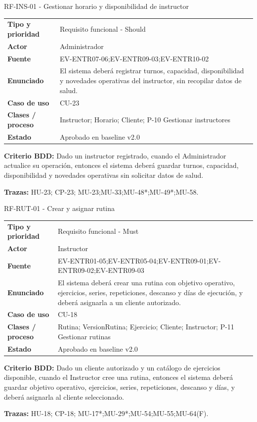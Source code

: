 \begin{reqbox}{RF-INS-01 - Gestionar horario y disponibilidad de instructor}
\begin{tabularx}{\textwidth}{>{\bfseries}p{3.2cm}Y}
Tipo y prioridad & Requisito funcional - Should \\
Actor & Administrador \\
Fuente & EV-ENTR07-06;EV-ENTR09-03;EV-ENTR10-02 \\
Enunciado & El sistema deberá registrar turnos, capacidad, disponibilidad y novedades operativas del instructor, sin recopilar datos de salud. \\
Caso de uso & CU-23 \\
Clases / proceso & Instructor; Horario; Cliente; P-10 Gestionar instructores \\
Estado & Aprobado en baseline v2.0 \\
\end{tabularx}
\textbf{Criterio BDD:} Dado un instructor registrado, cuando el Administrador actualice su operación, entonces el sistema deberá guardar turnos, capacidad, disponibilidad y novedades operativas sin solicitar datos de salud.

\textbf{Trazas:} HU-23; CP-23; MU-23;MU-33;MU-48*;MU-49*;MU-58.
\end{reqbox}


\begin{reqbox}{RF-RUT-01 - Crear y asignar rutina}
\begin{tabularx}{\textwidth}{>{\bfseries}p{3.2cm}Y}
Tipo y prioridad & Requisito funcional - Must \\
Actor & Instructor \\
Fuente & EV-ENTR01-05;EV-ENTR05-04;EV-ENTR09-01;EV-ENTR09-02;EV-ENTR09-03 \\
Enunciado & El sistema deberá crear una rutina con objetivo operativo, ejercicios, series, repeticiones, descanso y días de ejecución, y deberá asignarla a un cliente autorizado. \\
Caso de uso & CU-18 \\
Clases / proceso & Rutina; VersionRutina; Ejercicio; Cliente; Instructor; P-11 Gestionar rutinas \\
Estado & Aprobado en baseline v2.0 \\
\end{tabularx}
\textbf{Criterio BDD:} Dado un cliente autorizado y un catálogo de ejercicios disponible, cuando el Instructor cree una rutina, entonces el sistema deberá guardar objetivo operativo, ejercicios, series, repeticiones, descanso y días, y deberá asignarla al cliente seleccionado.

\textbf{Trazas:} HU-18; CP-18; MU-17*;MU-29*;MU-54;MU-55;MU-64(F).
\end{reqbox}


